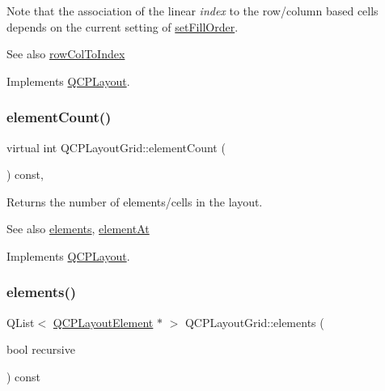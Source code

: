 Note that the association of the linear {\itshape index} to the row/column based cells depends on the current setting of \hyperlink{classQCPLayoutGrid_affc2f3cfd22f28698c5b29b960d2a391}{set\+Fill\+Order}.

\begin{DoxySeeAlso}{See also}
\hyperlink{classQCPLayoutGrid_a682ba76f130810ffd294032a1bfbcfcb}{row\+Col\+To\+Index} 
\end{DoxySeeAlso}


Implements \hyperlink{classQCPLayout_afa73ca7d859f8a3ee5c73c9b353d2a56}{Q\+C\+P\+Layout}.

\mbox{\label{classQCPLayoutGrid_a9a8942aface780a02445ebcf14c48513}} 
\subsubsection{\texorpdfstring{element\+Count()}{elementCount()}}
{\footnotesize\ttfamily virtual int Q\+C\+P\+Layout\+Grid\+::element\+Count (\begin{DoxyParamCaption}{ }\end{DoxyParamCaption}) const\hspace{0.3cm}{\ttfamily [inline]}, {\ttfamily [virtual]}}

Returns the number of elements/cells in the layout.

\begin{DoxySeeAlso}{See also}
\hyperlink{classQCPLayoutGrid_a7d5b968b4cf57393e9e387976d91f8f7}{elements}, \hyperlink{classQCPLayoutGrid_a4288f174082555f6bd92021bdedb75dc}{element\+At} 
\end{DoxySeeAlso}


Implements \hyperlink{classQCPLayout_a39d3e9ef5d9b82ab1885ba1cb9597e56}{Q\+C\+P\+Layout}.

\mbox{\label{classQCPLayoutGrid_a7d5b968b4cf57393e9e387976d91f8f7}} 
\subsubsection{\texorpdfstring{elements()}{elements()}}
{\footnotesize\ttfamily Q\+List$<$ \hyperlink{classQCPLayoutElement}{Q\+C\+P\+Layout\+Element} $\ast$ $>$ Q\+C\+P\+Layout\+Grid\+::elements (\begin{DoxyParamCaption}\item[{bool}]{recursive }\end{DoxyParamCaption}) const\hspace{0.3cm}{\ttfamily [virtual]}}

